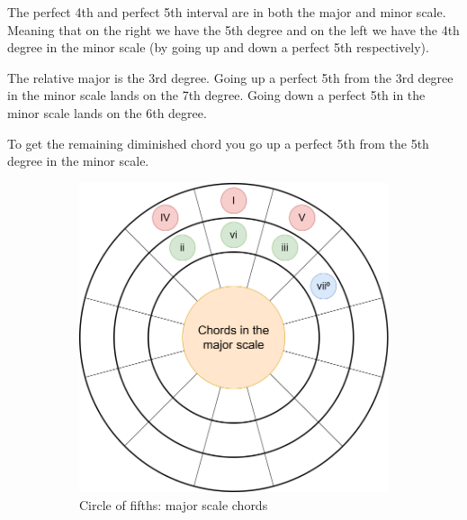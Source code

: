 The perfect 4th and perfect 5th interval are in both the major and minor scale. Meaning that on the right we have the 5th degree and on the left we have the 4th degree in the minor scale (by going up and down a perfect 5th respectively).

The relative major is the 3rd degree. Going up a perfect 5th from the 3rd degree in the minor scale lands on the 7th degree. Going down a perfect 5th in the minor scale lands on the 6th degree.

To get the remaining diminished chord you go up a perfect 5th from the 5th degree in the minor scale.

\begin{figure}[h]
	\centering
	\begin{subfigure}{0.47\textwidth}
		\includegraphics[width=\textwidth]{../../Images/CircleOfFifthsChordsInTheMajorScale.png}
		\caption{Circle of fifths: major scale chords}
		\label{fig:circle_of_fifths_major_scale_chords}
	\end{subfigure}
	\hfill
	\begin{subfigure}{0.47\textwidth}

\end{subfigure}
\end{figure}
